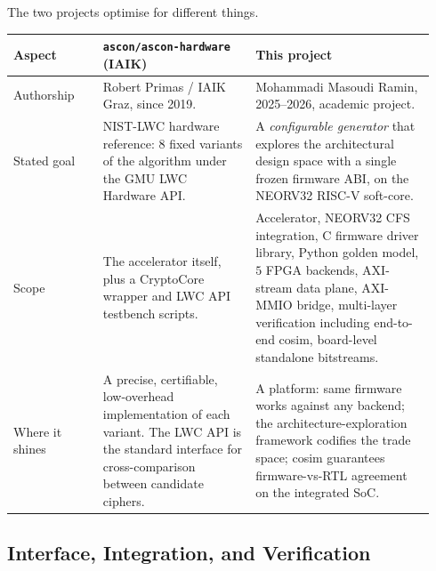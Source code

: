 \documentclass[11pt,a4paper]{article}
\begin{document}
The two projects optimise for different things.

\begin{center}
\begin{longtable}{p{0.20\linewidth}p{0.34\linewidth}p{0.40\linewidth}}
\toprule
\rowcolor{tabhead!20}\textbf{Aspect} & \textbf{\texttt{ascon/ascon-hardware} (IAIK)} & \textbf{This project}\\
\midrule
Authorship       & Robert Primas / IAIK Graz, since 2019.            & Mohammadi Masoudi Ramin, 2025--2026, academic project.\\
Stated goal      & NIST-LWC hardware reference: $8$ fixed variants of the algorithm under the GMU LWC Hardware API. & A \emph{configurable generator} that explores the architectural design space with a single frozen firmware ABI, on the NEORV32 RISC-V soft-core.\\
Scope            & The accelerator itself, plus a CryptoCore wrapper and LWC API testbench scripts. & Accelerator, NEORV32 CFS integration, C firmware driver library, Python golden model, $5$ FPGA backends, AXI-stream data plane, AXI-MMIO bridge, multi-layer verification including end-to-end cosim, board-level standalone bitstreams.\\
Where it shines  & A precise, certifiable, low-overhead implementation of each variant. The LWC API is the standard interface for cross-comparison between candidate ciphers. & A platform: same firmware works against any backend; the architecture-exploration framework codifies the trade space; cosim guarantees firmware-vs-RTL agreement on the integrated SoC.\\
\bottomrule
\end{longtable}
\end{center}

\subsection{Interface, Integration, and Verification}
\end{document}
